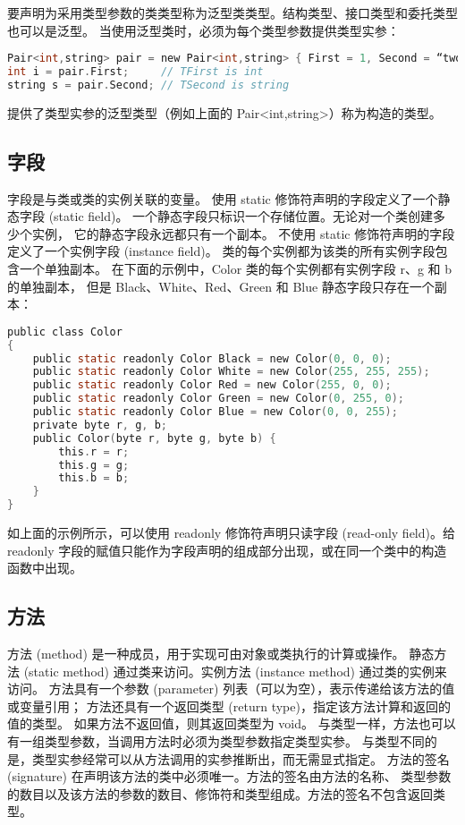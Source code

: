 要声明为采用类型参数的类类型称为泛型类类型。结构类型、接口类型和委托类型也可以是泛型。
当使用泛型类时，必须为每个类型参数提供类型实参：

 \begin{lstlisting}[language=C]
Pair<int,string> pair = new Pair<int,string> { First = 1, Second = “two” };
int i = pair.First;     // TFirst is int
string s = pair.Second; // TSecond is string
 \end{lstlisting}

提供了类型实参的泛型类型（例如上面的 Pair<int,string>）称为构造的类型。

\subsection{字段}
字段是与类或类的实例关联的变量。
使用 static 修饰符声明的字段定义了一个静态字段 (static field)。
一个静态字段只标识一个存储位置。无论对一个类创建多少个实例，
它的静态字段永远都只有一个副本。
不使用 static 修饰符声明的字段定义了一个实例字段 (instance field)。
类的每个实例都为该类的所有实例字段包含一个单独副本。
在下面的示例中，Color 类的每个实例都有实例字段 r、g 和 b 的单独副本，
但是 Black、White、Red、Green 和 Blue 静态字段只存在一个副本：

 \begin{lstlisting}[language=C]
public class Color
{
    public static readonly Color Black = new Color(0, 0, 0);
    public static readonly Color White = new Color(255, 255, 255);
    public static readonly Color Red = new Color(255, 0, 0);
    public static readonly Color Green = new Color(0, 255, 0);
    public static readonly Color Blue = new Color(0, 0, 255);
    private byte r, g, b;
    public Color(byte r, byte g, byte b) {
        this.r = r;
        this.g = g;
        this.b = b;
    }
}
 \end{lstlisting}

如上面的示例所示，可以使用 readonly 修饰符声明只读字段 (read-only field)。给 readonly 字段的赋值只能作为字段声明的组成部分出现，或在同一个类中的构造函数中出现。

\subsection{方法}

方法 (method) 是一种成员，用于实现可由对象或类执行的计算或操作。
静态方法 (static method) 通过类来访问。实例方法 (instance method) 通过类的实例来访问。
方法具有一个参数 (parameter) 列表（可以为空），表示传递给该方法的值或变量引用；
方法还具有一个返回类型 (return type)，指定该方法计算和返回的值的类型。
如果方法不返回值，则其返回类型为 void。
与类型一样，方法也可以有一组类型参数，当调用方法时必须为类型参数指定类型实参。
与类型不同的是，类型实参经常可以从方法调用的实参推断出，而无需显式指定。
方法的签名 (signature) 在声明该方法的类中必须唯一。方法的签名由方法的名称、
类型参数的数目以及该方法的参数的数目、修饰符和类型组成。方法的签名不包含返回类型。

